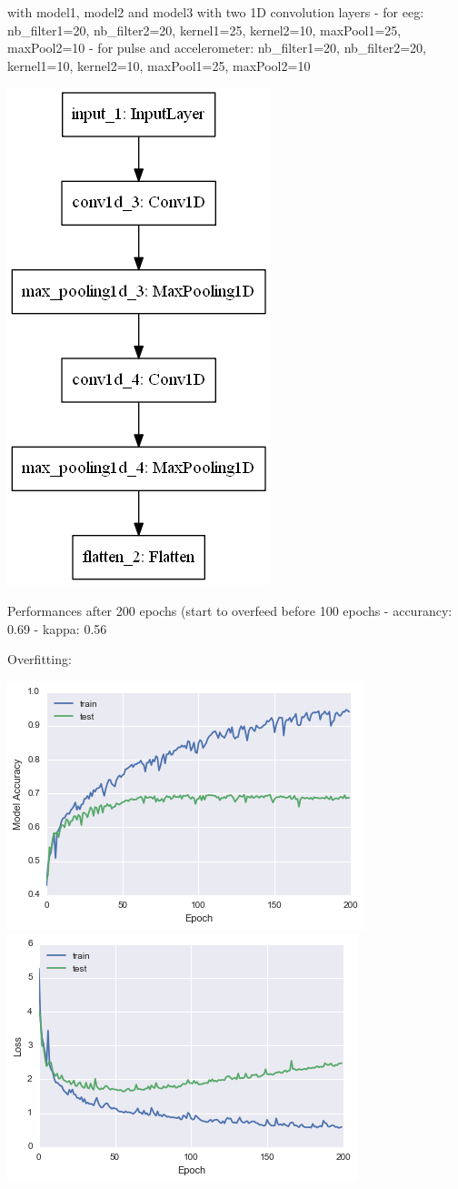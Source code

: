 \documentclass[11pt]{article}
\makeatletter
\def\maxwidth{\ifdim\Gin@nat@width>\linewidth\linewidth
    \else\Gin@nat@width\fi}
\let\Oldincludegraphics\includegraphics
\renewcommand{\includegraphics}[1]{\Oldincludegraphics[width=.8\maxwidth]{#1}}
\makeatother
\begin{document}
with model1, model2 and model3 with two 1D convolution layers - for eeg:
nb\_filter1=20, nb\_filter2=20, kernel1=25, kernel2=10, maxPool1=25,
maxPool2=10 - for pulse and accelerometer: nb\_filter1=20,
nb\_filter2=20, kernel1=10, kernel2=10, maxPool1=25, maxPool2=10

\includegraphics{model2_eeg.png}

Performances after 200 epochs (start to overfeed before 100 epochs -
accurancy: 0.69 - kappa: 0.56

Overfitting:

\includegraphics{mergeModel1_acc.png}
\includegraphics{mergeModel1_loss.png}
\end{document}
